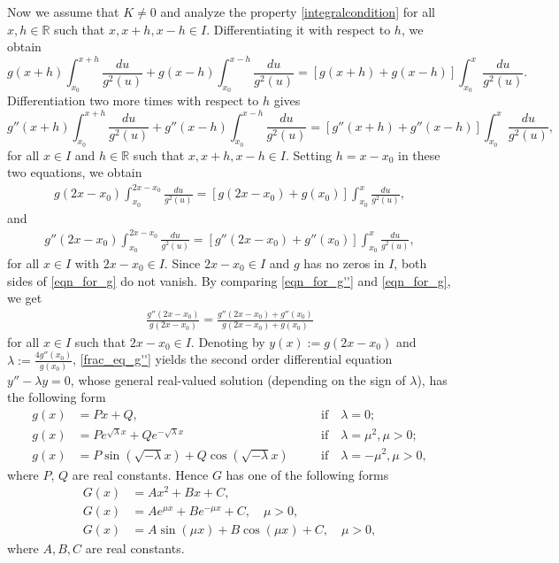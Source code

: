 \documentclass{birkjour}
\begin{document}
Now we assume that $K\neq 0$ and analyze the property \eqref{integralcondition} for all $x,h\in{{\mathbb R}}$ such that $x,x+h,x-h\in I$. Differentiating it with respect to $h$, we obtain 
\[
g(x+h)\int_{x_0}^{x+h}\frac{du}{g^2(u)} + g(x-h)\int_{x_0}^{x-h}\frac{du}{g^2(u)} = [g(x+h)+g(x-h)]\int_{x_0}^x\frac{du}{g^2(u)}.
\]
Differentiation two more times with respect to $h$ gives
\[
g''(x+h)\int_{x_0}^{x+h}\frac{du}{g^2(u)} + g''(x-h)\int_{x_0}^{x-h}\frac{du}{g^2(u)} = [g''(x+h)+g''(x-h)]\int_{x_0}^x\frac{du}{g^2(u)},
\]
for all $x\in I$ and $h\in{{\mathbb R}}$ such that $x,x+h,x-h\in I$. Setting $h=x-x_0$ in these two equations, we obtain
\begin{align} \label{eqn_for_g}
g(2x-x_0)\int_{x_0}^{2x-x_0}\frac{du}{g^2(u)}  = [g(2x-x_0)+g(x_0)]\int_{x_0}^x\frac{du}{g^2(u)},
\end{align}
and
\begin{align} \label{eqn_for_g''}
g''(2x-x_0)\int_{x_0}^{2x-x_0}\frac{du}{g^2(u)} = [g''(2x-x_0)+g''(x_0)]\int_{x_0}^x\frac{du}{g^2(u)},
\end{align}
for all $x\in I$ with $2x-x_0 \in I$. Since $2x-x_0\in I$ and $g$ has no zeros in $I$, both sides of \eqref{eqn_for_g} do not vanish. By comparing \eqref{eqn_for_g''} and \eqref{eqn_for_g}, we get 
\begin{align}\label{frac_eq_g''}
\frac{g''(2x-x_0)}{g(2x-x_0)} = \frac{g''(2x-x_0)+g''(x_0)}{g(2x-x_0)+g(x_0)}
\end{align}
for all $x\in I$ such that $2x-x_0 \in I$. Denoting by $y(x) := g(2x-x_0)$ and $\lambda := \frac{4g''(x_0)}{g(x_0)}$, \eqref{frac_eq_g''} yields the second order differential equation $y''-\lambda y=0$, whose general real-valued solution (depending on the sign of $\lambda$), has the following form
\begin{align*}
g(x) &= Px+Q, \quad &&\text{if} \quad \lambda=0;\\
g(x) &= Pe^{\sqrt{\lambda} x}+Qe^{-\sqrt{\lambda} x} \quad &&\text{if} \quad \lambda=\mu^2, \mu>0;\\
g(x) &= P\sin(\sqrt{-\lambda} x)+Q\cos(\sqrt{-\lambda} x) \quad &&\text{if} \quad \lambda=-\mu^2, \mu>0,
\end{align*}
where $P$, $Q$ are real constants. Hence $G$ has one of the following forms
\begin{align}\label{G_quad}
G(x)&=Ax^2+Bx+C,\\\label{G_exp}
G(x)&=Ae^{\mu x}+Be^{-\mu x}+C, \quad \mu>0,\\\label{G_trig}
G(x)&=A\sin(\mu x)+B\cos(\mu x)+C, \quad \mu>0,
\end{align}
where $A,B,C$ are real constants. 
\end{document}
